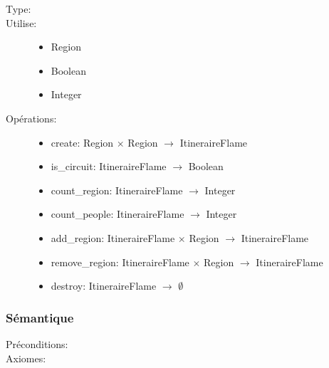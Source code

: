 \begin{description}
  \item[Type:]
  \item[Utilise:]\indent
    \begin{itemize}
      \item Region
      \item Boolean
      \item Integer
    \end{itemize}
  \item[Opérations:]\indent
    \begin{itemize}
      \item create: Region $\times$ Region $\to$ ItineraireFlame
      \item is\_circuit: ItineraireFlame $\to$ Boolean
      \item count\_region: ItineraireFlame $\to$ Integer
      \item count\_people: ItineraireFlame $\to$ Integer
      \item add\_region: ItineraireFlame $\times$ Region $\to$ ItineraireFlame
      \item remove\_region: ItineraireFlame $\times$ Region $\to$ ItineraireFlame
      \item destroy: ItineraireFlame $\to$ $\emptyset$
    \end{itemize}
\end{description}

\subsubsection{Sémantique}
\begin{description}
  \item[Préconditions:]\indent
  \item[Axiomes:]\indent
\end{description}


